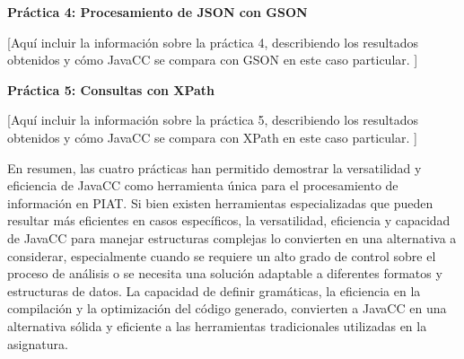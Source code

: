 \noindent \textbf{Práctica 4: Procesamiento de JSON con GSON}

\phantom{text}

[Aquí incluir la información sobre la práctica 4, describiendo los resultados obtenidos y cómo JavaCC se compara con GSON en este caso particular. ]


\phantom{text}

\noindent \textbf{Práctica 5: Consultas con XPath}

\phantom{text}

[Aquí incluir la información sobre la práctica 5, describiendo los resultados obtenidos y cómo JavaCC se compara con XPath en este caso particular. ]

En resumen, las cuatro prácticas han permitido demostrar la versatilidad y eficiencia de JavaCC como herramienta única para el procesamiento de información en PIAT. Si bien existen herramientas especializadas que pueden resultar más eficientes en casos específicos, la versatilidad, eficiencia y capacidad de JavaCC para manejar estructuras complejas lo convierten en una alternativa a considerar, especialmente cuando se requiere un alto grado de control sobre el proceso de análisis o se necesita una solución adaptable a diferentes formatos y estructuras de datos. La capacidad de definir gramáticas, la eficiencia en la compilación y la optimización del código generado, convierten a JavaCC en una alternativa sólida y eficiente a las herramientas tradicionales utilizadas en la asignatura.